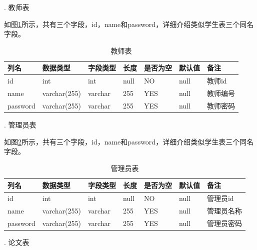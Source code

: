 .  教师表

如图\ref{db-teacher}所示，共有三个字段，id，name和password，详细介绍类似学生表三个同名字段。
\begin{table}[htbp]
    \centering
    \song\wuhao
    \caption{教师表}
    \label{db-teacher}
    \begin{tabular}{lllllll}
        \hline
        列名     & 数据类型     & 字段类型 & 长度 & 是否为空 & 默认值 & 备注     \\ \hline
        id       & int          & int      & null & NO       & null   & 教师id   \\
        name     & varchar(255) & varchar  & 255  & YES      & null   & 教师编号 \\
        password & varchar(255) & varchar  & 255  & YES      & null   & 教师密码 \\ \hline
    \end{tabular}
\end{table}

.  管理员表

如图\ref{db-admin}所示，共有三个字段，id，name和password，详细介绍类似学生表三个同名字段。
\begin{table}[htbp]
    \centering
    \song\wuhao
    \caption{管理员表}
    \label{db-admin}
    \begin{tabular}{lllllll}
        \hline
        列名     & 数据类型     & 字段类型 & 长度 & 是否为空 & 默认值 & 备注       \\ \hline
        id       & int          & int      & null & NO       & null   & 管理员id   \\
        name     & varchar(255) & varchar  & 255  & YES      & null   & 管理员名称 \\
        password & varchar(255) & varchar  & 255  & YES      & null   & 管理员密码 \\ \hline
    \end{tabular}
\end{table}

.  论文表

